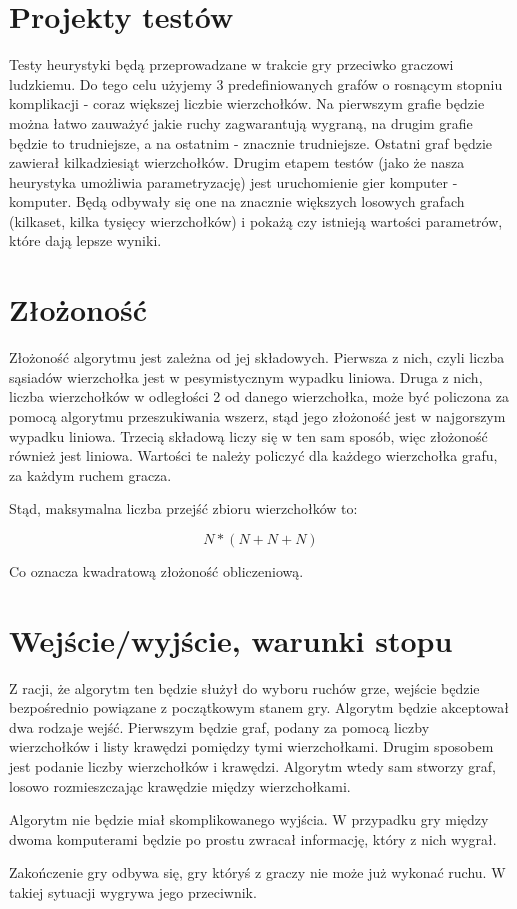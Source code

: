 \documentclass[11pt,a4paper]{article}
\begin{document}
\section{Projekty testów}
Testy heurystyki będą przeprowadzane w trakcie gry przeciwko graczowi ludzkiemu. Do tego celu użyjemy 3 predefiniowanych grafów o rosnącym stopniu komplikacji - coraz większej liczbie wierzchołków. Na pierwszym grafie będzie można łatwo zauważyć jakie ruchy zagwarantują wygraną, na drugim grafie będzie to trudniejsze, a na ostatnim - znacznie trudniejsze. Ostatni graf będzie zawierał kilkadziesiąt wierzchołków.
Drugim etapem testów (jako że nasza heurystyka umożliwia parametryzację) jest uruchomienie gier komputer - komputer. Będą odbywały się one na znacznie większych losowych grafach (kilkaset, kilka tysięcy wierzchołków) i pokażą czy istnieją wartości parametrów, które dają lepsze wyniki.

\section{Złożoność}
Złożoność algorytmu jest zależna od jej składowych. Pierwsza z nich, czyli liczba sąsiadów wierzchołka jest w pesymistycznym wypadku liniowa. Druga z nich, liczba wierzchołków w odległości 2 od danego wierzchołka, może być policzona za pomocą algorytmu przeszukiwania wszerz, stąd jego złożoność jest w najgorszym wypadku liniowa. Trzecią składową liczy się w ten sam sposób, więc złożoność również jest liniowa. Wartości te należy policzyć dla każdego wierzchołka grafu, za każdym ruchem gracza.

Stąd, maksymalna liczba przejść zbioru wierzchołków to:

$$N*(N + N + N)$$

Co oznacza kwadratową złożoność obliczeniową. 

\section{Wejście/wyjście, warunki stopu}
Z racji, że algorytm ten będzie służył do wyboru ruchów grze, wejście będzie bezpośrednio powiązane z początkowym stanem gry. Algorytm będzie akceptował dwa rodzaje wejść. Pierwszym będzie graf, podany za pomocą liczby wierzchołków i listy krawędzi pomiędzy tymi wierzchołkami. Drugim sposobem jest podanie liczby wierzchołków i krawędzi. Algorytm wtedy sam stworzy graf, losowo rozmieszczając krawędzie między wierzchołkami. 

Algorytm nie będzie miał skomplikowanego wyjścia. W przypadku gry między dwoma komputerami będzie po prostu zwracał informację, który z nich wygrał. 

Zakończenie gry odbywa się, gry któryś z graczy nie może już wykonać ruchu. W takiej sytuacji wygrywa jego przeciwnik.
\end{document}
